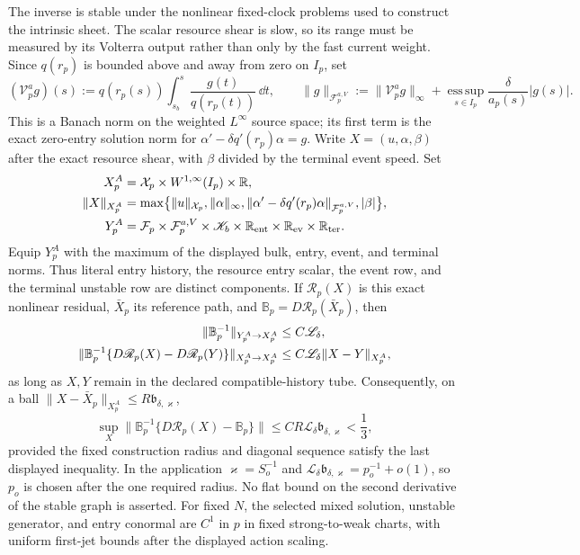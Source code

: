 \begin{proposition}
The inverse is stable under the nonlinear fixed-clock problems used to
construct the intrinsic sheet.  The scalar resource shear is slow, so its
range must be measured by its Volterra output rather than only by the fast
current weight.  Since \(q(r_p)\) is bounded above and away from zero on
\(I_p\), set
\[
 (\mathcal V_p^ag)(s)
 :=q(r_p(s))\int_{s_b}^{s}\frac{g(t)}{q(r_p(t))}\,\dd t,
 \qquad
 \|g\|_{\mathcal F_p^{a,V}}
 :=\|\mathcal V_p^ag\|_\infty
   +\operatorname*{ess\,sup}_{s\in I_p}
       \frac{\delta}{a_p(s)}|g(s)|.
\]
This is a Banach norm on the weighted \(L^\infty\) source space; its first
term is the exact zero-entry solution norm for
\(\alpha'-\delta q'(r_p)\alpha=g\).
Write \(X=(u,\alpha,\beta)\) after the exact resource shear, with
\(\beta\) divided by the terminal event speed.  Set
\begin{align*}
 X_p^A&=\mathcal X_p\times W^{1,\infty}(I_p)\times\mathbb R,\\
 \|X\|_{X_p^A}
 &=\max\bigl\{\|u\|_{\mathcal X_p},\|\alpha\|_\infty,
   \|\alpha'-\delta q'(r_p)\alpha\|_{\mathcal F_p^{a,V}},
   |\beta|\bigr\},\\
 Y_p^A&=\mathcal F_p\times\mathcal F_p^{a,V}\times
   \mathscr K_b\times\mathbb R_{\rm ent}\times
   \mathbb R_{\rm ev}\times\mathbb R_{\rm ter}.
\end{align*}
Equip \(Y_p^A\) with the maximum of the displayed bulk, entry, event, and
terminal norms.  Thus literal entry history, the resource entry scalar, the event
row, and the terminal unstable row are distinct components.  If
\(\mathscr R_p(X)\) is this exact nonlinear residual, \(\bar X_p\) its
reference path, and
\(\mathbb B_p=D\mathscr R_p(\bar X_p)\), then
\begin{align}
 \|\mathbb B_p^{-1}\|_{Y_p^A\to X_p^A}
 &\le C\mathscr L_\delta,\notag\\
 \|\mathbb B_p^{-1}\{D\mathscr R_p(X)
                  -D\mathscr R_p(Y)\}\|_{X_p^A\to X_p^A}
 &\le C\mathscr L_\delta\|X-Y\|_{X_p^A},
 \label{eq:anchor-toolkit-balanced-two-point}
\end{align}
as long as \(X,Y\) remain in the declared compatible-history tube.
Consequently, on a ball
\(\|X-\bar X_p\|_{X_p^A}\le R\mathfrak b_{\delta,\varkappa}\),
\begin{equation}
 \sup_X\|\mathbb B_p^{-1}
       \{D\mathscr R_p(X)-\mathbb B_p\}\|
 \le CR\mathscr L_\delta\mathfrak b_{\delta,\varkappa}<\frac13,
 \label{eq:anchor-toolkit-balanced-newton}
\end{equation}
provided the fixed construction radius and diagonal sequence satisfy the
last displayed inequality.  In the application
\(\varkappa=S_o^{-1}\) and
\(\mathscr L_\delta\mathfrak b_{\delta,\varkappa}
=p_o^{-1}+o(1)\), so \(p_o\) is chosen after the one required radius.
No flat bound on the second derivative of the stable graph is asserted.
For fixed \(N\), the selected mixed solution, unstable generator, and entry
conormal are \(C^1\) in \(p\) in fixed strong-to-weak charts, with uniform
first-jet bounds after the displayed action scaling.
\end{proposition}

